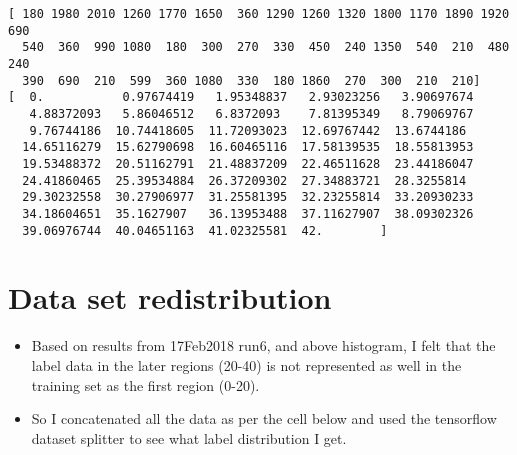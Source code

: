 \documentclass[11pt]{article}
\providecommand{\tightlist}{%
      \setlength{\itemsep}{0pt}\setlength{\parskip}{0pt}}
\begin{document}
    \begin{Verbatim}[commandchars=\\\{\}]
[ 180 1980 2010 1260 1770 1650  360 1290 1260 1320 1800 1170 1890 1920  690
  540  360  990 1080  180  300  270  330  450  240 1350  540  210  480  240
  390  690  210  599  360 1080  330  180 1860  270  300  210  210]
[  0.           0.97674419   1.95348837   2.93023256   3.90697674
   4.88372093   5.86046512   6.8372093    7.81395349   8.79069767
   9.76744186  10.74418605  11.72093023  12.69767442  13.6744186
  14.65116279  15.62790698  16.60465116  17.58139535  18.55813953
  19.53488372  20.51162791  21.48837209  22.46511628  23.44186047
  24.41860465  25.39534884  26.37209302  27.34883721  28.3255814
  29.30232558  30.27906977  31.25581395  32.23255814  33.20930233
  34.18604651  35.1627907   36.13953488  37.11627907  38.09302326
  39.06976744  40.04651163  41.02325581  42.        ]

    \end{Verbatim}

    \hypertarget{data-set-redistribution}{%
\section{Data set redistribution}\label{data-set-redistribution}}

\begin{itemize}
\tightlist
\item
  Based on results from 17Feb2018 run6, and above histogram, I felt that
  the label data in the later regions (20-40) is not represented as well
  in the training set as the first region (0-20).
\item
  So I concatenated all the data as per the cell below and used the
  tensorflow dataset splitter to see what label distribution I get.
\end{itemize}
\end{document}
